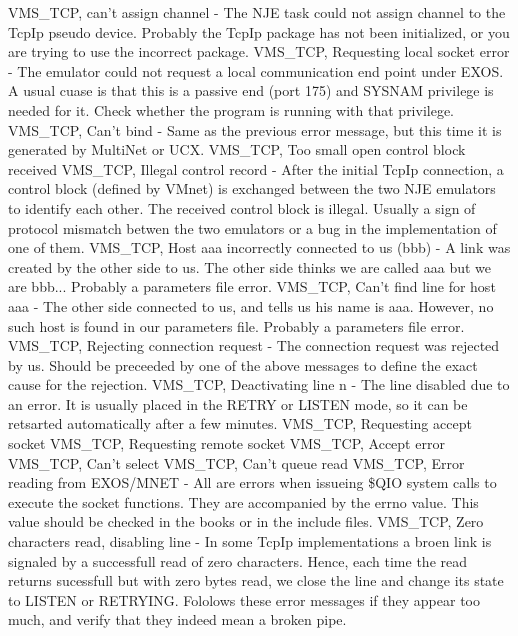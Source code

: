 \hfill\break
{\ncrBold VMS\_TCP, can't assign channel }
- The NJE task could not assign channel to
the  TcpIp  pseudo  device.  Probably  the  TcpIp  package  has not been
initialized, or you are trying to use the incorrect package.
\hfill\break
{\ncrBold VMS\_TCP, Requesting local socket error }
- The emulator could not  request
a  local  communication end point under EXOS. A usual cuase is that this
is a passive end (port 175) and SYSNAM privilege is needed for it. Check
whether the program is running with that privilege.
\hfill\break
{\ncrBold VMS\_TCP,  Can't bind }
- Same as the previous error message, but this time
it is generated by MultiNet or UCX.
\hfill\break
{\ncrBold VMS\_TCP, Too small open control block received}
\hfill\break
{\ncrBold VMS\_TCP, Illegal control record }
- After the initial TcpIp connection,  a
control  block  (defined  by  VMnet)  is  exchanged  between the two NJE
emulators to identify each other. The received control block is illegal.
Usually a sign of protocol mismatch betwen the two emulators or a bug in
the implementation of one of them.
\hfill\break
{\ncrBold VMS\_TCP, Host aaa incorrectly  connected  to  us  (bbb)}
-  A  link  was
created by the other side to us. The other side thinks we are called aaa
but we are bbb... Probably a parameters file error.
\hfill\break
{\ncrBold VMS\_TCP, Can't find line for host aaa}
-  The  other  side  connected  to
us,  and tells us his name is aaa. However, no such host is found in our
parameters file. Probably a parameters file error.
\hfill\break
{\ncrBold VMS\_TCP, Rejecting connection  request}
-  The  connection  request  was
rejected  by  us.  Should  be  preceeded by one of the above messages to
define the exact cause for the rejection.
\hfill\break
{\ncrBold VMS\_TCP, Deactivating line n }
- The line disabled due to an error. It  is
usually  placed  in  the  RETRY  or  LISTEN mode, so it can be retsarted
automatically after a few minutes.
\hfill\break
{\ncrBold VMS\_TCP, Requesting accept socket}
\hfill\break
{\ncrBold VMS\_TCP, Requesting remote socket}
\hfill\break
{\ncrBold VMS\_TCP, Accept error}
\hfill\break
{\ncrBold VMS\_TCP, Can't select}
\hfill\break
{\ncrBold VMS\_TCP, Can't queue read}
\hfill\break
{\ncrBold VMS\_TCP, Error reading from EXOS/MNET }
- All  are  errors  when  issueing
\$QIO  system calls to execute the socket functions. They are accompanied
by the errno value. This value should be checked in the books or in  the
include files.
\hfill\break
{\ncrBold VMS\_TCP,   Zero   characters  read,  disabling  line  }
-  In  some  TcpIp
implementations a broen link is signaled by a successfull read  of  zero
characters.  Hence,  each time the read returns sucessfull but with zero
bytes read, we close  the  line  and  change  its  state  to  LISTEN  or
RETRYING.  Fololows  these  error  messages if they appear too much, and
verify that they indeed mean a broken pipe.


